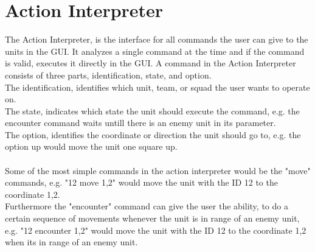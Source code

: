 \section{Action Interpreter}
The Action Interpreter, is the interface for all commands the user can give to the units in the GUI. 
It analyzes a single command at the time and if the command is valid, executes it directly in the GUI.
A command in the Action Interpreter consists of three parts, identification, state, and option.\\
The identification, identifies which unit, team, or squad the user wants to operate on.\\
The state, indicates which state the unit should execute the command, e.g. the encounter command waits untill there is an enemy unit in its parameter.\\
The option, identifies the coordinate or direction the unit should go to, e.g. the option up would move the unit one square up.\\
\\
Some of the most simple commands in the action interpreter would be the "move" commands, e.g. "12 move 1,2" would move the unit with the ID 12 to the coordinate 1,2.
\\
Furthermore the "encounter" command can give the user the ability, to do a certain sequence of movements whenever the unit is in range of an enemy unit, e.g. "12 encounter 1,2" would move the unit with the ID 12 to the coordinate 1,2 when its in range of an enemy unit.



